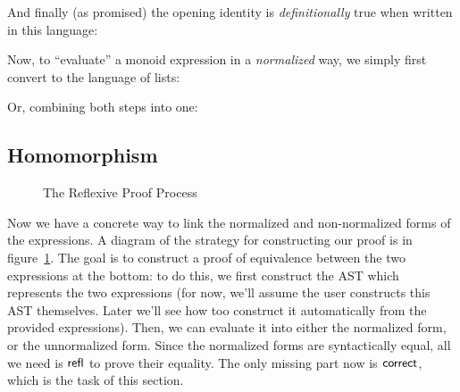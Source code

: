 \documentclass[draft, twocolumn]{article}
\theoremstyle{definition}
\theoremstyle{definition}
\begin{document}
And finally (as promised) the opening identity is \emph{definitionally} true
when written in this language:

Now, to ``evaluate'' a monoid expression in a \emph{normalized} way, we simply
first convert to the language of lists:

Or, combining both steps into one:
\subsection{Homomorphism}
\begin{figure}
  \caption{The Reflexive Proof Process}
  \label{proof-process}
\end{figure}
Now we have a concrete way to link the normalized and non-normalized forms of
the expressions. A diagram of the strategy for constructing our proof is in
figure~\ref{proof-process}. The goal is to construct a proof of equivalence
between the two expressions at the bottom: to do this, we first construct the
AST which represents the two expressions (for now, we'll assume the user
constructs this AST themselves. Later we'll see how too construct it
automatically from the provided expressions). Then, we can evaluate it into
either the normalized form, or the unnormalized form. Since the normalized forms
are syntactically equal, all we need is \(\AgdaInductiveConstructor{refl}\) to
prove their equality. The only missing part now is \(\AgdaFunction{correct}\),
which is the task of this section.
\end{document}
